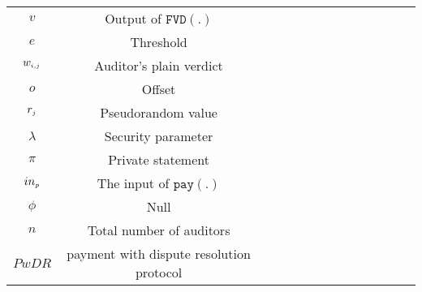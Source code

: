\begin{table}[!htbp]
\begin{scriptsize}
\begin{center}
{{\begin{tabular}{|c|c|c|c|c|c|c|c|c|c|c|c|c|c|}
%
\cellcolor{gray!20}\scriptsize$v$ &\cellcolor{gray!20}\scriptsize  Output of $\mathtt{FVD}(.)$\\ 
%
\cellcolor{white!20}\scriptsize$e$ &\cellcolor{white!20}\scriptsize  Threshold\\ 
%            
 \cellcolor{gray!20}\scriptsize$w_{\scriptscriptstyle i,j}$ &\cellcolor{gray!20}\scriptsize  Auditor's plain verdict\\ 
%     
\cellcolor{white!20}\scriptsize$o$ &\cellcolor{white!20}\scriptsize  Offset\\  
  \cellcolor{gray!20}\scriptsize$r_{\scriptscriptstyle j}$ &\cellcolor{gray!20}\scriptsize  Pseudorandom value\\   
\cellcolor{white!20}\scriptsize$\lambda$ &\cellcolor{white!20}\scriptsize Security parameter\\  
%


                
%
\cellcolor{gray!20}\scriptsize$\pi$ &\cellcolor{gray!20}\scriptsize Private statement\\        
\cellcolor{white!20}\scriptsize$in_{\scriptscriptstyle p}$ &\cellcolor{white!20}\scriptsize The input of $\mathtt{pay}(.)$\\    
%
\cellcolor{gray!20}\scriptsize$\phi$ &\cellcolor{gray!20}\scriptsize  Null\\ 
%
\cellcolor{white!20}\scriptsize$n$ &\cellcolor{white!20}\scriptsize  Total number of auditors\\  
%           
%
%
%
\cellcolor{gray!20}\scriptsize$PwDR$ &\cellcolor{gray!20}\scriptsize  payment with dispute resolution protocol\\ 
\hline 

      

           
              
\end{tabular}\label{table:notation-table}
%
}
}
\end{center}
\end{scriptsize}
\end{table}





























